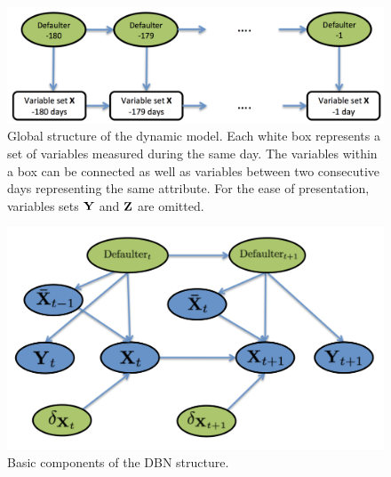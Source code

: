 \begin{figure}[htbp]
\begin{center}
\includegraphics[scale=0.45]{./figures/CajaMarModel1}
\caption{Global structure of the dynamic model. Each white box represents a set of variables measured during the same day. The variables within a box can be connected as well as variables between two consecutive days representing the same attribute. For the ease of presentation, variables sets $\mathbf{Y}$ and $\mathbf{Z}$ are omitted.}
\label{fig:global_temp}
\end{center}
\end{figure}


\begin{figure}[htbp]
\begin{center}
\includegraphics[scale=0.45]{./figures/CajaMarModel2}
\caption{Basic components of the DBN structure.}
\label{fig:component}
\end{center}
\end{figure}

